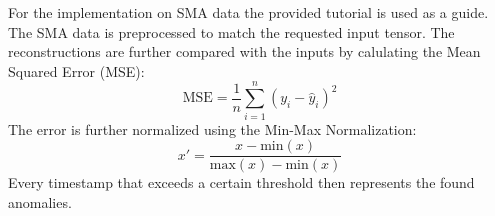 For the implementation on SMA data the provided tutorial is used as a guide. The SMA data is preprocessed to match the requested input tensor. The reconstructions are further compared with the inputs by calulating the Mean Squared Error (MSE):
\begin{equation}
    \text{MSE} = \frac{1}{n} \sum_{i=1}^{n} \left( y_i - \hat{y}_i \right)^2
\end{equation}
The error is further normalized using the Min-Max Normalization:
\begin{equation}
x' = \frac{x - \text{min}(x)}{\text{max}(x) - \text{min}(x)}
\end{equation}
Every timestamp that exceeds a certain threshold then represents the found anomalies.

